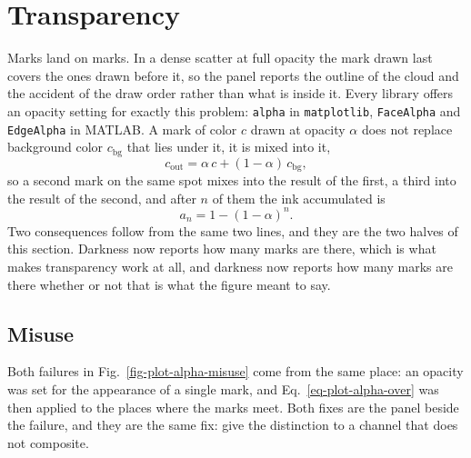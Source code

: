 \section{Transparency}\label{sec-app-plot-alpha}

Marks land on marks. In a dense scatter at full opacity the mark drawn last covers the ones drawn before it, so the panel reports the outline of the cloud and the accident of the draw order rather than what is inside it. Every library offers an opacity setting for exactly this problem: \texttt{alpha} in \texttt{matplotlib}, \texttt{FaceAlpha} and \texttt{EdgeAlpha} in MATLAB. A mark of color $c$ drawn at opacity $\alpha$ does not replace background color $c_{\mathrm{bg}}$ that lies under it, it is mixed into it,
\begin{equation}
	c_{\mathrm{out}} = \alpha\,c + (1-\alpha)\,c_{\mathrm{bg}} ,
	\label{eq-plot-alpha-over}
\end{equation}
so a second mark on the same spot mixes into the result of the first, a third into the result of the second, and after $n$ of them the ink accumulated is
\begin{equation}
	a_n = 1 - (1-\alpha)^n .
	\label{eq-plot-alpha-stack}
\end{equation}
Two consequences follow from the same two lines, and they are the two halves of this section. Darkness now reports how many marks are there, which is what makes transparency work at all, and darkness now reports how many marks are there whether or not that is what the figure meant to say.

\subsection{Misuse}\label{sec-app-plot-alpha-misuse}

Both failures in Fig.~\ref{fig-plot-alpha-misuse} come from the same place: an opacity was set for the appearance of a single mark, and Eq.~\eqref{eq-plot-alpha-over} was then applied to the places where the marks meet. Both fixes are the panel beside the failure, and they are the same fix: give the distinction to a channel that does not composite.

